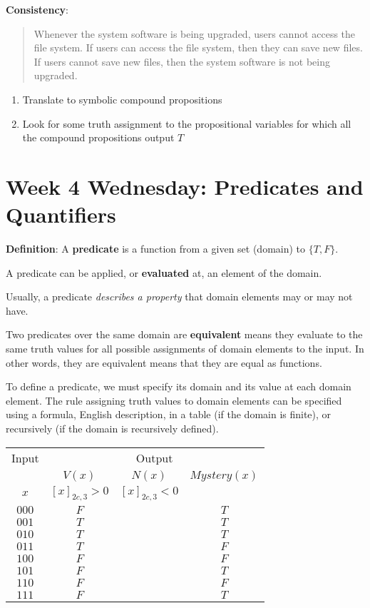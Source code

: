 \documentclass[12pt, oneside]{article}
\begin{document}
{\bf Consistency}: 
\begin{quote}
Whenever the system software is being upgraded, users cannot access the file system. 
If users can access the file system, then they can save new files. 
If users cannot save new files, then the system software is not being upgraded.
\end{quote}

\begin{enumerate}
\item Translate to symbolic compound propositions
\vfill
\item Look for some truth assignment to the propositional variables for which all the compound propositions output $T$
\vfill
\end{enumerate} \newpage


\section*{Week 4 Wednesday: Predicates and Quantifiers}


{\bf  Definition}: A  {\bf predicate}  is  a function from a given set (domain) to $\{T,F\}$.

A predicate can be applied, or {\bf evaluated} at, an element of the domain.

Usually, a predicate {\it describes a  property} that domain elements may or may not have.

Two predicates over the same domain are {\bf equivalent} means they evaluate to
the same truth values for all possible assignments of domain elements to the
input. In other words, they are equivalent means that they are equal as functions.

To define a predicate, we must specify its domain and its value at each domain element.
The rule assigning truth values to domain elements can be specified using a formula, 
English description, in a table (if the domain is finite), or recursively (if the domain is recursively
defined). 

\begin{center}
    \begin{tabular}{c||c|c|c}
    Input & \multicolumn{3}{c}{Output} \\
    &$V(x)$ & $N(x)$ & $Mystery(x)$\\
    $x$ & $[x]_{2c,3} > 0$ & $[x]_{2c,3} < 0$& \\
    \hline
    $000$  & $F$ & & $T$\\
    $001$  & $T$ & & $T$\\
    $010$  & $T$ & & $T$\\
    $011$  & $T$ & & $F$\\
    $100$  & $F$ & & $F$\\
    $101$  & $F$ & & $T$\\
    $110$  & $F$ & & $F$\\
    $111$  & $F$ & & $T$\\
    \end{tabular}
    \end{center}
    
\end{document}
